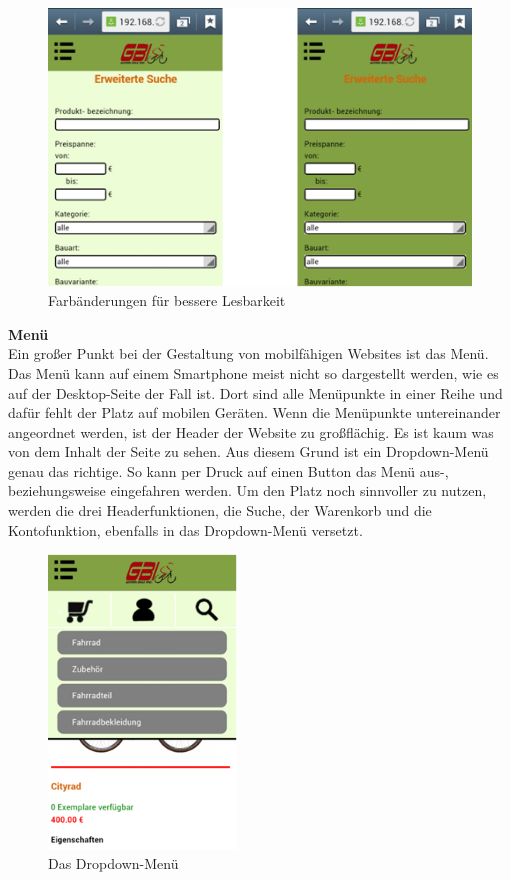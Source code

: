 \begin{figure}[H]
\begin{center}
\includegraphics[width=12cm]{Bilder/Michael_Abbildung4-FarbaenderungenFuerBessereLesbarkeit.png}
\end{center}
\caption{Farbänderungen für bessere Lesbarkeit}
\end{figure}

\textbf{Menü}
\\
Ein großer Punkt bei der Gestaltung von mobilfähigen Websites ist das Menü. Das Menü kann auf einem Smartphone meist nicht so dargestellt werden, wie es auf der Desktop-Seite der Fall ist. Dort sind alle Menüpunkte in einer Reihe und dafür fehlt der Platz auf mobilen Geräten. Wenn die Menüpunkte untereinander angeordnet werden, ist der Header der Website zu großflächig. Es ist kaum was von dem Inhalt der Seite zu sehen. Aus diesem Grund ist ein Dropdown-Menü genau das richtige. So kann per Druck auf einen Button das Menü aus-, beziehungsweise eingefahren werden. Um den Platz noch sinnvoller zu nutzen, werden die drei Headerfunktionen, die Suche, der Warenkorb und die Kontofunktion, ebenfalls in das Dropdown-Menü versetzt.

\begin{figure}[H]
\begin{center}
\includegraphics[width=5cm]{Bilder/Michael_Abbildung5-DasDropDownMenue.png}
\end{center}
\caption{Das Dropdown-Menü}
\end{figure}

